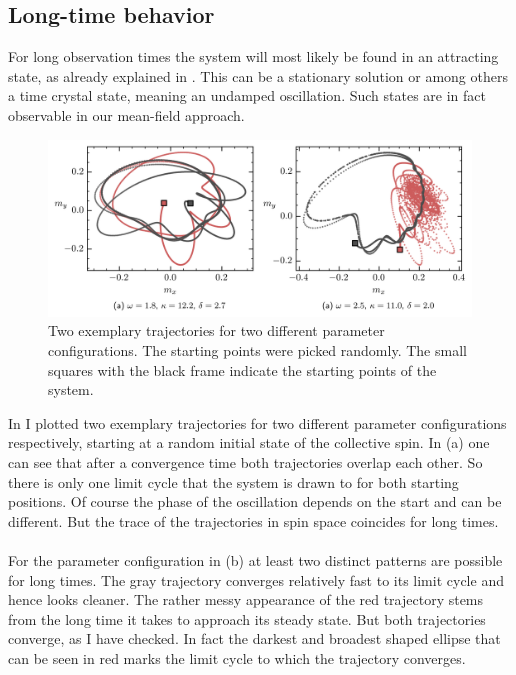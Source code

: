 \subsection{Long-time behavior}
For long observation times the system will most likely be found in an attracting state, as already explained in . This can be a stationary solution or among others a time crystal state, meaning an undamped oscillation. Such states are in fact observable in our mean-field approach. 
\begin{figure}[H]
    \hspace*{-1.2cm}
    \includegraphics[scale=1]{pictures/lc_example.png}
    \caption{Two exemplary trajectories for two different parameter configurations. The starting points were picked randomly. The small squares with the black frame indicate the starting points of the system.}
    \label{fig:expl_lc}
\end{figure}
In  I plotted two exemplary trajectories for two different parameter configurations respectively, starting at a random initial state of the collective spin. In  (a) one can see that after a convergence time both trajectories overlap each other. So there is only one limit cycle that the system is drawn to for both starting positions. Of course the phase of the oscillation depends on the start and can be different. But the trace of the trajectories in spin space coincides for long times. \\\\For the parameter configuration in  (b) at least two distinct patterns are possible for long times. The gray trajectory converges relatively fast to its limit cycle and hence looks cleaner. The rather messy appearance of the red trajectory stems from the long time it takes to approach its steady state. But both trajectories converge, as I have checked. In fact the darkest and broadest shaped ellipse that can be seen in red marks the limit cycle to which the trajectory converges.\\\\
